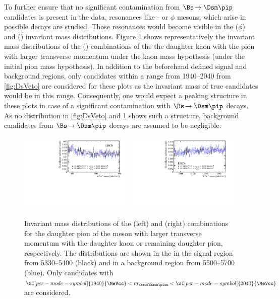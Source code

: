 To further ensure that no significant contamination from $\Bs\!\to\Dsm\pip$ candidates is present in the data, resonances like \Kstarz- or $\phi$ mesons, which arise in possible \Dsm decays are studied.
Those resonances would become visible in the \kaon\kaon ($\phi$) and \kaon\pion (\Kstarz) invariant mass distributions.
Figure \ref{fig:phi_Kst_veto} shows representatively the invariant mass distributions of the \kaon\kaon (\kaon\pion) combinations of the the daughter kaon with the
pion with larger transverse momentum under the kaon mass hypothesis (under the initial pion mass hypothesis).
In addition to the beforehand defined signal and background regions, only candidates within a range from \SIrange[per-mode=symbol,range-units=single]{1940}{2040}{\MeVcc} from \cref{fig:DsVeto} are considered for these plots as the invariant mass of true \Ds candidates would be in this range.
Consequently, one would expect a peaking structure in these plots in case of a significant contamination with $\Bs\!\to\Dsm\pip$ decays.
As no distribution in \cref{fig:DsVeto} and \cref{fig:phi_Kst_veto} shows such a structure, background candidates from $\Bs\!\to\Dsm\pip$ decays are assumed to be negligible.
\begin{figure}[tbp]
    \centering
    \includegraphics[width=0.485\textwidth]{07selection/figs/KstarHypo2.pdf}
    \includegraphics[width=0.485\textwidth]{07selection/figs/PhiHypo2.pdf}
    \caption{Invariant mass distributions of the \kaon\pion (left) and \kaon\kaon (right) combinations for the daughter pion of the \Dm meson with larger transverse momentum with the daughter kaon or remaining daughter pion, respectively.
    The distributions are shown in the in the \Bs signal region from \SIrange[per-mode=symbol]{5330}{5400}{\MeVcc} (black) and in a background region from \SIrange[per-mode=symbol]{5500}{5700}{\MeVcc} (blue).
    Only candidates with $\SI[per-mode=symbol]{1940}{\MeVcc}<m_{\kaon\kaon\pion}<\SI[per-mode=symbol]{2040}{\MeVcc}$ are considered.}
    \label{fig:phi_Kst_veto}
\end{figure}

